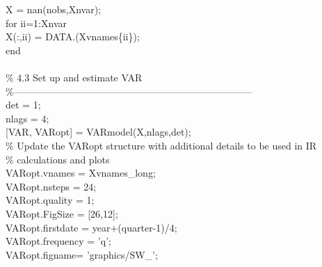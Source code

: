 \hspace{1mm}X = nan(nobs,Xnvar); \\ 
\hspace{1mm}\textcolor{matlabblue}{for} ii=1:Xnvar \\ 
\hspace{1mm}\hspace{5mm} X(:,ii) = DATA.(Xvnames\{ii\}); \\ 
\hspace{1mm}\textcolor{matlabblue}{end} \\ 
\hspace{1mm} \\ 
\hspace{1mm}\textcolor{matlabgreen}{\% 4.3 Set up and estimate VAR }\\ 
\hspace{1mm}\textcolor{matlabgreen}{\%--------------------------------------------------------------------------  }\\ 
\hspace{1mm}det = 1; \\ 
\hspace{1mm}nlags = 4; \\ 
\hspace{1mm}[VAR, VARopt] = VARmodel(X,nlags,det); \\ 
\hspace{1mm}\textcolor{matlabgreen}{\% Update the VARopt structure with additional details to be used in IR  }\\ 
\hspace{1mm}\textcolor{matlabgreen}{\% calculations and plots }\\ 
\hspace{1mm}VARopt.vnames = Xvnames\_long; \\ 
\hspace{1mm}VARopt.nsteps = 24; \\ 
\hspace{1mm}VARopt.quality = 1; \\ 
\hspace{1mm}VARopt.FigSize = [26,12]; \\ 
\hspace{1mm}VARopt.firstdate = year+(quarter-1)/4; \\ 
\hspace{1mm}VARopt.frequency = \textcolor{matlabpurple}{'q'}; \\ 
\hspace{1mm}VARopt.figname= \textcolor{matlabpurple}{'graphics/SW\_'}; \\ 
